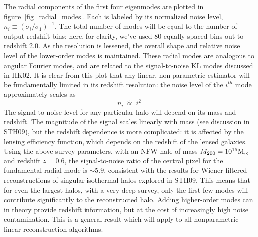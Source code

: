 \documentclass[twocolumn]{emulateapj}
\newcommand{\myvec}[1]{\boldsymbol{#1}}
\newcommand{\mymat}[1]{#1}
\begin{document}
\begin{figure*}[t]
 \centering
 \caption{\textit{left panel:} 
   The radial components of the first four
   columns of the matrix $\mymat{V}$ (see section~\ref{LinearMapping}).
   This is calculated for 100 equally spaced redshift bins $(0\le z\le 2.5)$ 
   in $\myvec{\gamma}$, and 80 bins $(0\le z\le 2.0)$ in $\myvec{\delta}$
   These orthogonal eigenmodes are analogous to radial Fourier modes.  Each
   is labeled by its relative noise level, $n_i = (\sigma_i/\sigma_1)^{-1}$.
   \textit{right panel:}
   The singular values $\sigma_i$ associated with the 80 radial eigenmodes.
 \label{fig_radial_modes} }
\end{figure*} 

The radial components of the first four eigenmodes are plotted in 
figure~\ref{fig_radial_modes}.  Each is labeled by its normalized 
noise level, $n_i \equiv (\sigma_i/\sigma_1)^{-1}$.
The total number of modes will be equal to the number of output redshift 
bins; here, for clarity, we've used 80 equally-spaced bins out to redshift 2.0.
As the resolution is lessened, the overall shape and relative noise level of 
the lower-order modes is maintained.
These radial modes are analogous to angular Fourier modes,
and are related to the signal-to-noise KL modes discussed in HK02.
It is clear from this plot that any linear, non-parametric
estimator will be fundamentally limited in its redshift resolution: 
the noise level of the $i^{th}$ mode approximately scales as
\begin{equation}
  n_i\ \widetilde{\propto}\ i^2
\end{equation}
The signal-to-noise level for any particular halo will depend on
its mass and redshift. The magnitude of the signal
scales linearly with mass (see discussion in STH09), 
but the redshift dependence is more complicated: it is
affected by the lensing efficiency function, which depends on the redshift
of the lensed galaxies.  Using the above survey parameters, with an NFW halo 
of mass $M_{200} = 10^{15} \rm{M_\odot}$ and redshift $z=0.6$, 
the signal-to-noise ratio 
of the central pixel for the fundamental radial mode is $\sim 5.9$,
consistent with the results for Wiener filtered reconstructions of
singular isothermal halos explored in STH09.
This means that for even the largest halos, with a very deep survey,
only the first few modes will contribute significantly 
to the reconstructed halo.  Adding higher-order modes can in theory 
provide redshift information, but at the cost of increasingly high 
noise contamination. This is a general result which will apply to all 
nonparametric linear reconstruction algorithms.
\end{document}
